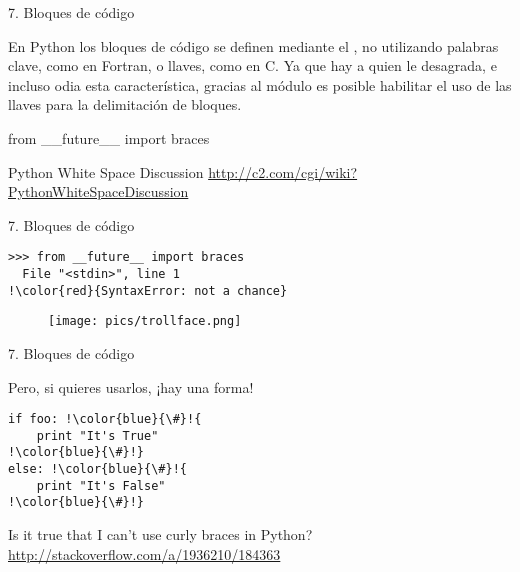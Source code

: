 
\begin{frame}{7. Bloques de código}
  \small
  \begin{center}
    En Python los bloques de código se definen mediante el
    , no utilizando palabras clave, como en
    Fortran, o llaves, como en C. Ya que hay a quien le desagrada, e
    incluso odia esta característica, gracias al módulo
     es posible habilitar el uso de las
    llaves para la delimitación de bloques.
  \end{center}

  \Large
  \begin{alertblock}{}
    \centering
    from \_\_future\_\_ import braces
  \end{alertblock}

  \vspace{0.5cm}

  \small
  \begin{block}{\centering Python White Space Discussion}
    \centering
    \url{http://c2.com/cgi/wiki?PythonWhiteSpaceDiscussion}
  \end{block}
\end{frame}

\begin{frame}[fragile]{7. Bloques de código}
  \begin{exampleblock}{}
    \small
    \begin{lstlisting}[escapechar=!]
>>> from __future__ import braces
  File "<stdin>", line 1
!\color{red}{SyntaxError: not a chance}
    \end{lstlisting}
  \end{exampleblock}

  \begin{figure}
    \centering
    \texttt{[image: pics/trollface.png]}
  \end{figure}
\end{frame}

\begin{frame}[fragile]{7. Bloques de código}
  \begin{alertblock}{}
    \centering
    Pero, si  quieres usarlos, ¡hay una forma!
  \end{alertblock}

\begin{exampleblock}{}
    \small
    \begin{lstlisting}[escapechar=!]
if foo: !\color{blue}{\#}!{
    print "It's True"
!\color{blue}{\#}!}
else: !\color{blue}{\#}!{
    print "It's False"
!\color{blue}{\#}!}
    \end{lstlisting}
  \end{exampleblock}

  \small
  \begin{block}{\centering Is it true that I can't use curly braces in Python?}
    \centering
    \url{http://stackoverflow.com/a/1936210/184363}
  \end{block}
\end{frame}
